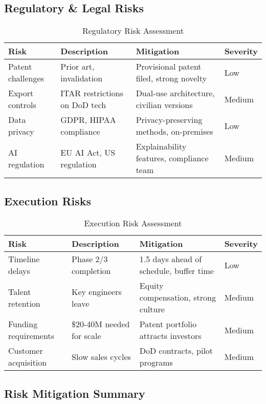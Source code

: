\documentclass[11pt,letterpaper]{article}
\begin{document}
\subsection{Regulatory \& Legal Risks}

\begin{table}[H]
\centering
\begin{tabularx}{\textwidth}{lXXl}
\toprule
\textbf{Risk} & \textbf{Description} & \textbf{Mitigation} & \textbf{Severity} \\
\midrule
Patent challenges & Prior art, invalidation & Provisional patent filed, strong novelty & Low \\
Export controls & ITAR restrictions on DoD tech & Dual-use architecture, civilian versions & Medium \\
Data privacy & GDPR, HIPAA compliance & Privacy-preserving methods, on-premises & Low \\
AI regulation & EU AI Act, US regulation & Explainability features, compliance team & Medium \\
\bottomrule
\end{tabularx}
\caption{Regulatory Risk Assessment}
\end{table}

\subsection{Execution Risks}

\begin{table}[H]
\centering
\begin{tabularx}{\textwidth}{lXXl}
\toprule
\textbf{Risk} & \textbf{Description} & \textbf{Mitigation} & \textbf{Severity} \\
\midrule
Timeline delays & Phase 2/3 completion & 1.5 days ahead of schedule, buffer time & Low \\
Talent retention & Key engineers leave & Equity compensation, strong culture & Medium \\
Funding requirements & \$20-40M needed for scale & Patent portfolio attracts investors & Medium \\
Customer acquisition & Slow sales cycles & DoD contracts, pilot programs & Medium \\
\bottomrule
\end{tabularx}
\caption{Execution Risk Assessment}
\end{table}

\subsection{Risk Mitigation Summary}
\end{document}
